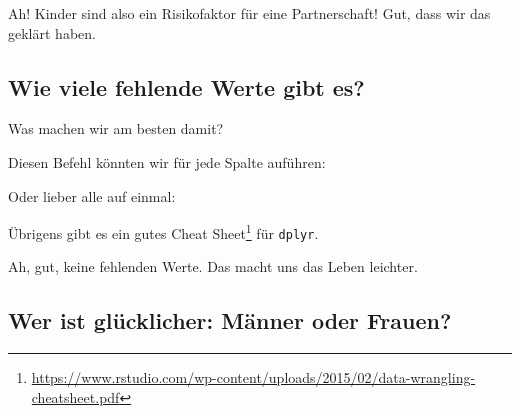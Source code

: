 \documentclass[12pt,ngerman,]{book}
\makeatletter
\newenvironment{Shaded}{\begin{snugshade}}{\end{snugshade}}
\newcommand{\KeywordTok}[1]{\textcolor[rgb]{0.13,0.29,0.53}{\textbf{{#1}}}}
\newcommand{\DataTypeTok}[1]{\textcolor[rgb]{0.13,0.29,0.53}{{#1}}}
\newcommand{\StringTok}[1]{\textcolor[rgb]{0.31,0.60,0.02}{{#1}}}
\newcommand{\CommentTok}[1]{\textcolor[rgb]{0.56,0.35,0.01}{\textit{{#1}}}}
\newcommand{\NormalTok}[1]{{#1}}
\let\rmarkdownfootnote\footnote%
\def\footnote{\protect\rmarkdownfootnote}
\renewcommand{\href}[2]{#2\footnote{\url{#1}}}
\newenvironment{kframe}{%
\medskip{}
\setlength{\fboxsep}{.8em}
 \def\at@end@of@kframe{}%
 \ifinner\ifhmode%
  \def\at@end@of@kframe{\end{minipage}}%
  \begin{minipage}{\columnwidth}%
 \fi\fi%
 \def\FrameCommand##1{\hskip\@totalleftmargin \hskip-\fboxsep
 \colorbox{shadecolor}{##1}\hskip-\fboxsep
     \hskip-\linewidth \hskip-\@totalleftmargin \hskip\columnwidth}%
 \MakeFramed {\advance\hsize-\width
   \@totalleftmargin\z@ \linewidth\hsize
   \@setminipage}}%
 {\par\unskip\endMakeFramed%
 \at@end@of@kframe}
\renewenvironment{Shaded}{\begin{kframe}}{\end{kframe}}
\makeatother
\begin{document}
Ah! Kinder sind also ein Risikofaktor für eine Partnerschaft! Gut, dass
wir das geklärt haben.

\subsection{Wie viele fehlende Werte gibt
es?}\label{wie-viele-fehlende-werte-gibt-es}

Was machen wir am besten damit?

Diesen Befehl könnten wir für jede Spalte auführen:

\begin{Shaded}
\end{Shaded}

Oder lieber alle auf einmal:

\begin{Shaded}
\end{Shaded}

Übrigens gibt es ein gutes
\href{https://www.rstudio.com/wp-content/uploads/2015/02/data-wrangling-cheatsheet.pdf}{Cheat
Sheet} für \texttt{dplyr}.

Ah, gut, keine fehlenden Werte. Das macht uns das Leben leichter.

\subsection{Wer ist glücklicher: Männer oder
Frauen?}\label{wer-ist-glucklicher-manner-oder-frauen}

\begin{Shaded}
\end{Shaded}
\end{document}
